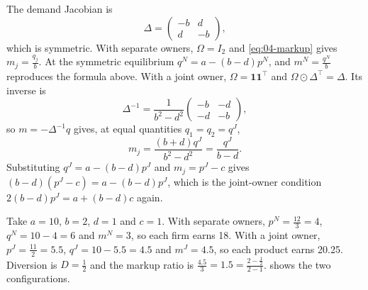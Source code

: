 \begin{example}
The demand Jacobian is
\begin{equation*}
\Delta = \begin{pmatrix}-b & d\\ d & -b\end{pmatrix},
\end{equation*}
which is symmetric. With separate owners, $\Omega = I_2$ and \eqref{eq:04-markup} gives $m_j = \frac{q_j}{b}$. At the symmetric equilibrium
$q^N = a - (b - d)p^N$, and $m^N = \frac{q^N}{b}$ reproduces the formula above. With a joint owner,
$\Omega = \mathbf{1}\mathbf{1}^\top$ and $\Omega \odot \Delta^\top = \Delta$. Its inverse is
\begin{equation*}
\Delta^{-1} = \frac{1}{b^2 - d^2}\begin{pmatrix}-b & -d\\ -d & -b\end{pmatrix},
\end{equation*}
so $m = -\Delta^{-1}q$ gives, at equal quantities $q_1 = q_2 = q^J$,
\begin{equation*}
m_j = \frac{(b + d)q^J}{b^2 - d^2} = \frac{q^J}{b - d}.
\end{equation*}
Substituting $q^J = a - (b - d)p^J$ and $m_j = p^J - c$ gives $(b - d)(p^J - c) = a - (b - d)p^J$, which is the
joint-owner condition $2(b - d)p^J = a + (b - d)c$ again.

Take $a = 10$, $b = 2$, $d = 1$ and $c = 1$. With separate owners, $p^N = \frac{12}{3} = 4$, $q^N = 10 - 4 = 6$ and
$m^N = 3$, so each firm earns 18. With a joint owner, $p^J = \frac{11}{2} = 5.5$, $q^J = 10 - 5.5 = 4.5$ and
$m^J = 4.5$, so each product earns 20.25. Diversion is $D = \frac{1}{2}$ and the markup ratio is
$\frac{4.5}{3} = 1.5 = \frac{2 - \frac{1}{2}}{2 - 1}$.  shows the two configurations.
\end{example}

